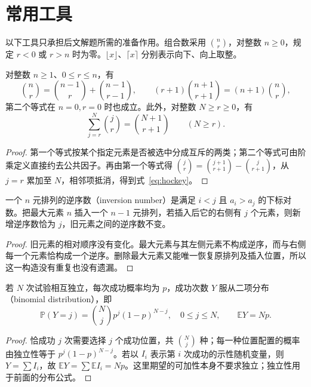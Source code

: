 \documentclass[UTF8]{ctexart}
\begin{document}
\section{常用工具}\label{sec:tools}
以下工具只承担后文解题所需的准备作用。组合数采用 $\binom nr$，对整数 $n\geq0$，规定 $r<0$ 或 $r>n$ 时为零。$\lfloor x\rfloor$、$\lceil x\rceil$ 分别表示向下、向上取整。

\begin{lemma}[组合数的相邻关系与逐项累加]\label{lem:binomial}
对整数 $n\geq1$、$0\leq r\leq n$，有
\[
\binom nr=\binom{n-1}r+\binom{n-1}{r-1},\qquad
(r+1)\binom{n+1}{r+1}=(n+1)\binom nr,
\]
第二个等式在 $n=0,r=0$ 时也成立。此外，对整数 $N\geq r\geq0$，有
\begin{equation}\label{eq:hockey}
\sum_{j=r}^{N}\binom jr=\binom{N+1}{r+1}\qquad(N\geq r).
\end{equation}
\end{lemma}
\begin{proof}
第一个等式按某个指定元素是否被选中分成互斥的两类；第二个等式可由阶乘定义直接约去公共因子。再由第一个等式得 $\binom jr=\binom{j+1}{r+1}-\binom j{r+1}$，从 $j=r$ 累加至 $N$，相邻项抵消，得到式~\eqref{eq:hockey}。
\end{proof}

\begin{lemma}[插入最大元素与逆序数]\label{lem:insert}
一个 $n$ 元排列的逆序数（inversion number）是满足 $i<j$ 且 $a_i>a_j$ 的下标对数。把最大元素 $n$ 插入一个 $n-1$ 元排列，若插入后它的右侧有 $j$ 个元素，则新增逆序数恰为 $j$，旧元素之间的逆序数不变。
\end{lemma}
\begin{proof}
旧元素的相对顺序没有变化。最大元素与其左侧元素不构成逆序，而与右侧每一个元素恰构成一个逆序。删除最大元素又能唯一恢复原排列及插入位置，所以这一构造没有重复也没有遗漏。
\end{proof}

\begin{lemma}[相同成功率的独立试验]\label{lem:binomial-law}
若 $N$ 次试验相互独立，每次成功概率均为 $p$，成功次数 $Y$ 服从二项分布（binomial distribution），即
\[
\mathbb P(Y=j)=\binom Njp^j(1-p)^{N-j},\quad 0\leq j\leq N,
\qquad \mathbb E Y=Np.
\]
\end{lemma}
\begin{proof}
恰成功 $j$ 次需要选择 $j$ 个成功位置，共 $\binom Nj$ 种；每一种位置配置的概率由独立性等于 $p^j(1-p)^{N-j}$。若以 $I_i$ 表示第 $i$ 次成功的示性随机变量，则 $Y=\sum I_i$，故 $\mathbb E Y=\sum\mathbb E I_i=Np$。这里期望的可加性本身不要求独立；独立性用于前面的分布公式。
\end{proof}
\end{document}
